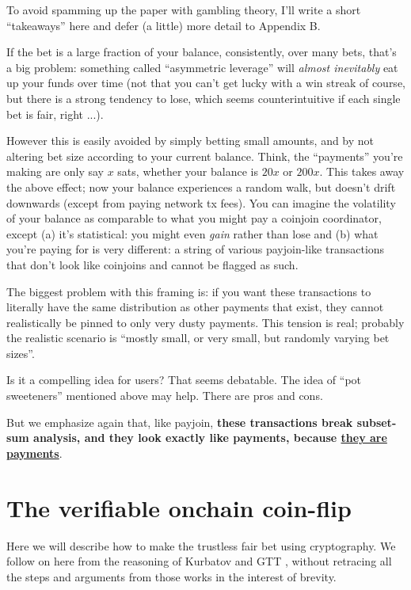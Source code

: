 \documentclass[11pt]{article}
\begin{document}
To avoid spamming up the paper with gambling theory, I'll write a short ``takeaways'' here and defer (a little) more detail to Appendix B.

If the bet is a large fraction of your balance, consistently, over many bets, that's a big problem: something called ``asymmetric leverage'' will \emph{almost inevitably} eat up your funds over time (not that you can't get lucky with a win streak of course, but there is a strong tendency to lose, which seems counterintuitive if each single bet is fair, right ...).

However this is easily avoided by simply betting small amounts, and by not altering bet size according to your current balance. Think, the ``payments'' you're making are only say $x$ sats, whether your balance is $20x$ or $200x$. This takes away the above effect; now your balance experiences a random walk, but doesn't drift downwards (except from paying network tx fees). You can imagine the volatility of your balance as comparable to what you might pay a coinjoin coordinator, except (a) it's statistical: you might even \emph{gain} rather than lose and (b) what you're paying for is very different: a string of various payjoin-like transactions that don't look like coinjoins and cannot be flagged as such.

The biggest problem with this framing is: if you want these transactions to literally have the same distribution as other payments that exist, they cannot realistically be pinned to only very dusty payments. This tension is real; probably the realistic scenario is ``mostly small, or very small, but randomly varying bet sizes''.

Is it a compelling idea for users? That seems debatable. The idea of ``pot sweeteners'' mentioned above may help. There are pros and cons.

But we emphasize again that, like payjoin, \textbf{these transactions break subset-sum analysis, and they look exactly like payments, because \underline{they are payments}}.





\section{The verifiable onchain coin-flip}
\label{sec:crypto}

Here we will describe how to make the trustless fair bet using cryptography. We follow on here from the reasoning of Kurbatov \cite{kurbatov2025oprand} and GTT \cite{gerhardt2026}, without retracing all the steps and arguments from those works in the interest of brevity.
\end{document}
